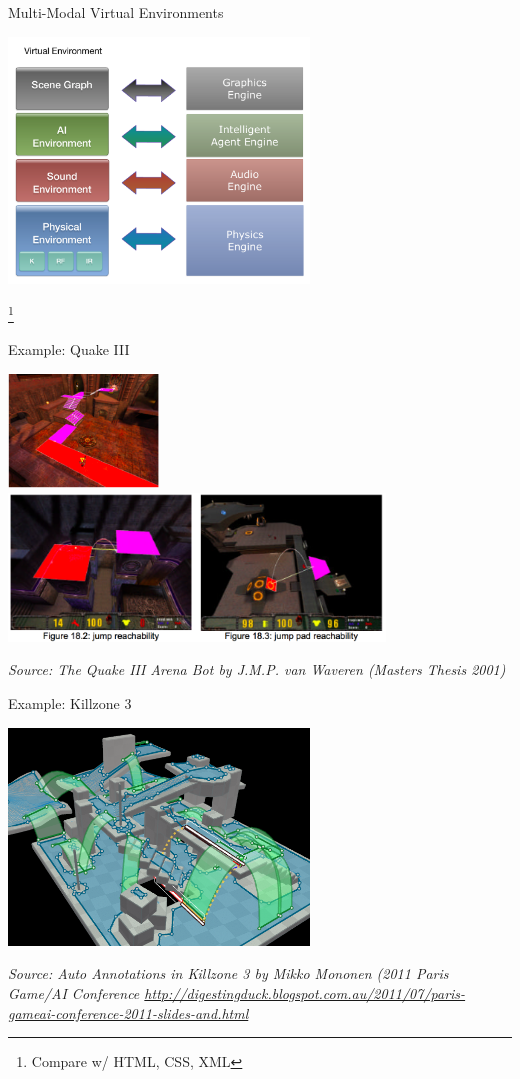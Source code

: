 \documentclass[xcolor=dvipsnames,t]{beamer}
\begin{document}
\begin{frame}{Multi-Modal Virtual Environments} 
\begin{center}
\includegraphics[width=8cm]{multi-modal} 
\end{center} 
\footnote{Compare w/ HTML, CSS, XML}
\end{frame} 

\begin{frame}{Example: Quake III} 
\begin{center}
\includegraphics[width=4cm]{q3-route} \\
\includegraphics[width=10cm]{q3-annotations} 
\end{center} 
\tiny
\emph{Source: The Quake III Arena Bot by J.M.P. van Waveren (Masters Thesis 2001)}
\normalsize
\end{frame} 

\begin{frame}{Example: Killzone 3} 
\begin{center} 
\includegraphics[width=8cm]{killzone3.png} 
\end{center} 
\tiny
\emph{Source: Auto Annotations in Killzone 3 by Mikko Mononen (2011 Paris
Game/AI Conference
\url{http://digestingduck.blogspot.com.au/2011/07/paris-gameai-conference-2011-slides-and.html}} 
\normalsize
\end{frame} 
\end{document}
